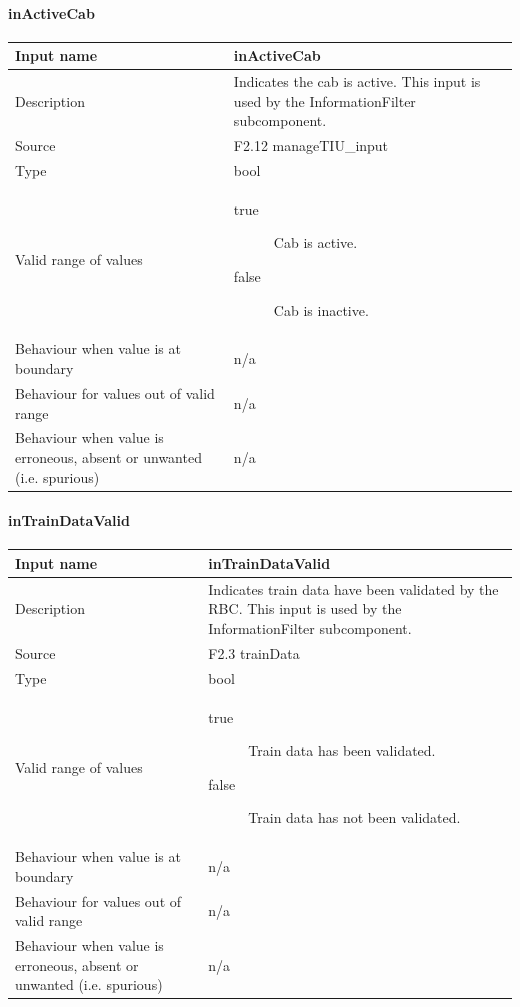 \paragraph{inActiveCab}

\begin{longtable}{p{}p{}}
\toprule
Input name				& inActiveCab \\
\midrule
Description				& Indicates the cab is active. This input is used by the InformationFilter subcomponent. \\
\midrule
Source					& F2.12 manageTIU\_input\\ 
\midrule
Type					& bool\\
\midrule
Valid range of values	& 
\begin{description}
\item[true] Cab is active.
\item[false] Cab is inactive.
\end{description}\\
\midrule
Behaviour when value is at boundary	& n/a\\
\midrule
Behaviour for values out of valid range	& n/a\\
\midrule
Behaviour when value is erroneous, absent or unwanted (i.e. spurious) & n/a\\
\bottomrule
\end{longtable}

\paragraph{inTrainDataValid}

\begin{longtable}{p{}p{}}
\toprule
Input name			& inTrainDataValid \\
\midrule
Description			& Indicates train data have been validated by the RBC. This input is used by the InformationFilter subcomponent. \\
\midrule
Source				& F2.3 trainData\\ 
\midrule
Type				& bool \\
\midrule
Valid range of values		& 
\begin{description}
\item[true] Train data has been validated.
\item[false] Train data has not been validated.
\end{description}\\
\midrule
Behaviour when value is at boundary	& n/a\\
\midrule
Behaviour for values out of valid range	& n/a\\
\midrule
Behaviour when value is erroneous, absent or unwanted (i.e. spurious) & n/a\\
\bottomrule
\end{longtable}

